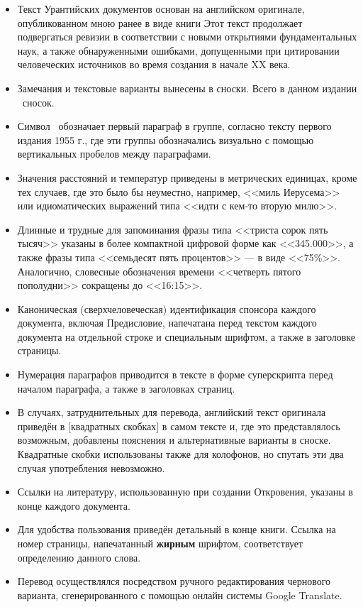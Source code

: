 \begin{itemize}
\item Текст Урантийских документов основан на английском оригинале, опубликованном мною ранее в виде книги
      Этот текст продолжает подвергаться ревизии в соответствии с новыми открытиями фундаментальных наук, а также обнаруженными
      ошибками, допущенными при цитировании человеческих источников во время создания
       в начале XX века.
\item Замечания и текстовые варианты вынесены в сноски. Всего в данном издании \totalnfnsts\ сносок.
\item Символ \pc\ обозначает первый параграф в группе, согласно тексту первого издания 1955 г., где эти группы обозначались визуально с помощью вертикальных пробелов между параграфами.
\item Значения расстояний и температур приведены в метрических единицах, кроме тех случаев, где это было бы неуместно,
      например, <<миль Иерусема>> или идиоматических выражений типа <<идти с кем-то вторую милю>>.
\item Длинные и трудные для запоминания фразы типа <<триста сорок пять тысяч>> указаны в более компактной цифровой
      форме как <<345.000>>, а также фразы типа <<семьдесят пять процентов>> --- в виде <<75\%>>.
      Аналогично, словесные обозначения времени <<четверть пятого пополудни>> сокращены до <<16:15>>.
\item Каноническая (сверхчеловеческая) идентификация спонсора каждого документа, включая Предисловие,
      напечатана перед текстом каждого документа на отдельной строке и специальным шрифтом, а также в заголовке страницы.
\item Нумерация параграфов приводится в тексте в форме суперскрипта перед началом параграфа, а также в заголовках страниц.
\item В случаях, затруднительных для перевода, английский текст оригинала приведён в
      [квадратных скобках] в самом тексте и, где это представлялось возможным,
      добавлены пояснения и альтернативные варианты в сноске.
      Квадратные скобки использованы также для колофонов, но спутать эти два случая употребления невозможно.
\item Ссылки на литературу, использованную при создании Откровения, указаны в конце каждого документа.
\item Для удобства пользования приведён детальный  в конце книги.
      Ссылка на номер страницы, напечатанный \textbf{жирным} шрифтом, соответствует определению данного слова.
\item Перевод осуществлялся посредством ручного редактирования чернового варианта, сгенерированного с помощью онлайн системы
      Google Translate.
\end{itemize}


